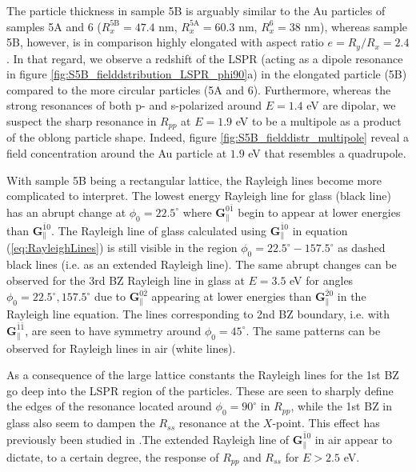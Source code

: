 The particle thickness in sample 5B is arguably similar to the Au particles of samples 5A and 6 ($R_x^\text{5B}=47.4$ nm, $R_x^\text{5A}=60.3$ nm, $R_x^\text{6}=38$ nm), whereas sample 5B, however, is in comparison highly elongated with aspect ratio $e=R_y/R_x=2.4$. In that regard, we observe a redshift of the LSPR (acting as a dipole resonance in figure \ref{fig:S5B_fielddstribution_LSPR_phi90}a) in the elongated particle (5B) compared to the more circular particles (5A and 6)\cite{multipolePlasmons_metalrods}. Furthermore, whereas the strong resonances of both p- and s-polarized around $E=1.4$ eV are dipolar, we suspect the sharp resonance in $R_{pp}$ at $E=1.9$ eV to be a multipole as a product of the oblong particle shape\cite{multipolePlasmons_metalrods}. Indeed, figure \ref{fig:S5B_fielddistr_multipole} reveal a field concentration around the Au particle at $1.9$ eV that resembles a quadrupole.


With sample 5B being a rectangular lattice, the Rayleigh lines become more complicated to interpret. The lowest energy Rayleigh line for glass (black line) has an abrupt change at $\phi_0=22.5^\circ$ where $\mathbf{G}_\parallel^{0\bar{1}}$ begin to appear at lower energies than $\mathbf{G}_\parallel^{\bar{1}0}$. The Rayleigh line of glass calculated using $\mathbf{G}_\parallel^{\bar{1}0}$ in equation (\ref{eq:RayleighLines}) is still visible in the region $\phi_0=22.5^\circ-157.5^\circ$ as dashed black lines (i.e. as an extended Rayleigh line). The same abrupt changes can be observed for the 3rd BZ Rayleigh line in glass at $E=3.5$ eV for angles $\phi_0=22.5^\circ, 157.5^\circ$ due to $\mathbf{G}_\parallel^{0\bar{2}}$ appearing at lower energies than $\mathbf{G}_\parallel^{\bar{2}0}$ in the Rayleigh line equation. The lines corresponding to 2nd BZ boundary, i.e. with $\mathbf{G}_\parallel^{\bar{1}\bar{1}}$, are seen to have symmetry around $\phi_0=45^\circ$. The same patterns can be observed for Rayleigh lines in air (white lines).
 
As a consequence of the large lattice constants the Rayleigh lines for the 1st BZ go deep into the LSPR region of the particles. These are seen to sharply define the edges of the resonance located around $\phi_0=90^\circ$ in $R_{pp}$, while the 1st BZ in glass also seem to dampen the $R_{ss}$ resonance at the $X$-point. This effect has previously been studied in \cite{narrowLSPRfromDiffractionCoupling}.The extended Rayleigh line of $\mathbf{G}_\parallel^{\bar{1}0}$ in air appear to dictate, to a certain degree, the response of  $R_{pp}$ and $R_{ss}$ for $E>2.5$ eV.


